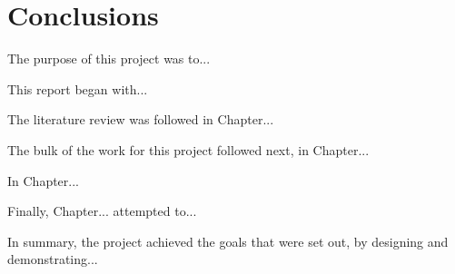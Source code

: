 % 
% 
% 
\chapter{Conclusions \label{ch:conclusions}}

The purpose of this project was to...

This report began with...

The literature review was followed in Chapter...

The bulk of the work for this project followed next, in Chapter... 

In Chapter...

Finally, Chapter... attempted to... 

In summary, the project achieved the goals that were set out, by designing and demonstrating...

% 
% 
